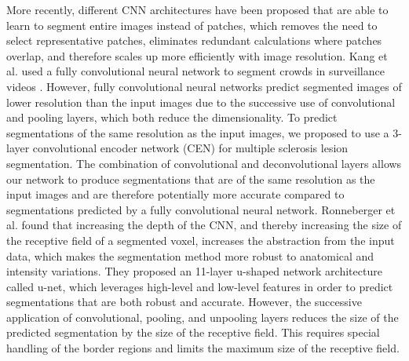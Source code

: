 More recently, different CNN architectures
\cite{ronneberger2015,brosch2015,kang2014fully} have been proposed that are able
to learn to segment entire images instead of patches, which removes the need to
select representative patches, eliminates redundant calculations where patches
overlap, and therefore scales up more efficiently with image resolution. Kang et
al. used a fully convolutional neural network to segment crowds in surveillance
videos \cite{kang2014fully}. However, fully convolutional neural networks
predict segmented images of lower resolution than the input images due to the
successive use of convolutional and pooling layers, which both reduce the
dimensionality. To predict segmentations of the same resolution as the input
images, we proposed to use a 3-layer convolutional encoder network (CEN)
\cite{brosch2015} for multiple sclerosis lesion segmentation. The combination of
convolutional \cite{LeCun1998} and deconvolutional \cite{zeiler2011} layers
allows our network to produce segmentations that are of the same resolution as
the input images and are therefore potentially more accurate compared to
segmentations predicted by a fully convolutional neural network. Ronneberger et
al. \cite{ronneberger2015} found that increasing the depth of the CNN, and
thereby increasing the size of the receptive field of a segmented voxel,
increases the abstraction from the input data, which makes the segmentation
method more robust to anatomical and intensity variations. They proposed an
11-layer u-shaped network architecture called u-net, which leverages high-level
and low-level features in order to predict segmentations that are both robust
and accurate. However, the successive application of convolutional, pooling, and
unpooling layers reduces the size of the predicted segmentation by the size of
the receptive field. This requires special handling of the border regions and
limits the maximum size of the receptive field.

% 

